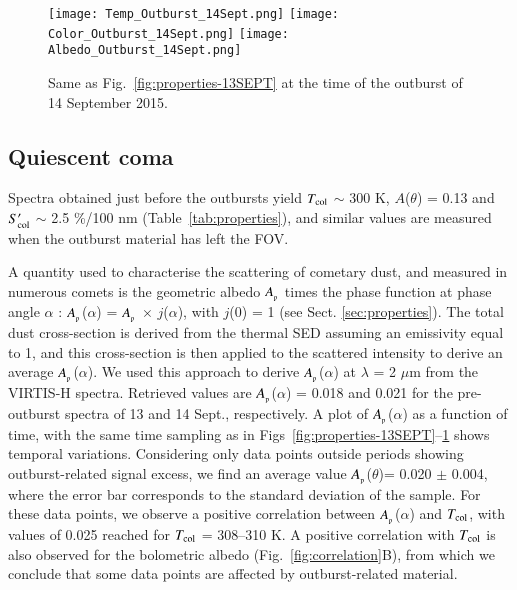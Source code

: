 \documentclass[a4paper,fleqn,usenatbib]{mnras}
\begin{document}
\begin{figure}
    \texttt{[image: Temp\_Outburst\_14Sept.png]}
    \texttt{[image: Color\_Outburst\_14Sept.png]}
    \texttt{[image: Albedo\_Outburst\_14Sept.png]}
\caption{Same as Fig.~\ref{fig:properties-13SEPT} at the time of the outburst of 14 September 2015.}
    \label{fig:properties-14SEPT}
\end{figure}

\subsection{Quiescent coma}
\label{sec:properties-back}

Spectra obtained just before the outbursts yield $T_{\rm col}$ $\sim$ 300 K, $A$($\theta$) = 0.13 and $S'_{\rm col}$ $\sim$ 2.5 \%/100 nm (Table~\ref{tab:properties}), and similar values are measured when the outburst material has left the FOV.

A quantity used to characterise the scattering of cometary dust, and measured in numerous comets \citep{Kolokolova2004} is the
geometric albedo $A_{\rm_p}$ times the phase function at phase angle $\alpha$ : $A_{\rm_p}$($\alpha$) = $A_{\rm_p}$ $\times$ $j$($\alpha$), with $j$(0) = 1 (see Sect. \ref{sec:properties}). The total dust cross-section is derived from the thermal SED assuming an emissivity equal to 1, and this cross-section is then applied to the scattered intensity to derive an average $A_{\rm_p}$($\alpha$). We used this approach
to derive $A_{\rm_p}$($\alpha$) at $\lambda$ = 2 $\mu$m from the VIRTIS-H spectra.
Retrieved values are $A_{\rm_p}$($\alpha$) = 0.018 and 0.021 for the pre-outburst spectra of 13 and 14 Sept., respectively. A plot of $A_{\rm_p}$($\alpha$) as a function of time, with the same time sampling as in Figs~\ref{fig:properties-13SEPT}--\ref{fig:properties-14SEPT} shows temporal variations.  Considering only data points  outside periods showing outburst-related signal excess, we find an average value $A_{\rm_p}$($\theta$)= 0.020 $\pm$ 0.004, where the error bar corresponds to the standard deviation of the sample.
For these data points, we observe a positive correlation between $A_{\rm_p}$($\alpha$) and $T_{\rm col}$, with values of 0.025 reached for $T_{\rm col}$ = 308--310 K. A positive correlation with $T_{\rm col}$ is also observed for the bolometric albedo
(Fig.~\ref{fig:correlation}B), from which we conclude that some data points  are affected by outburst-related material.
\end{document}
